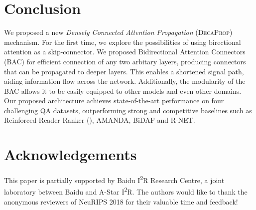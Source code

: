 \documentclass{article}
\begin{document}
\section{Conclusion}
We proposed a new \textit{Densely Connected Attention Propagation} (\textsc{DecaProp}) mechanism. For the first time, we explore the possibilities of using birectional attention as a skip-connector. We proposed Bidirectional Attention Connectors (BAC) for efficient connection of any two arbitary layers, producing connectors that can be propagated to deeper layers. This enables a shortened signal path, aiding information flow across the network. Additionally, the modularity of the BAC allows it to be easily equipped to other models and even other domains. Our proposed architecture achieves state-of-the-art performance on four challenging QA datasets, outperforming strong and competitive baselines such as Reinforced Reader Ranker (), AMANDA, BiDAF and R-NET.

\section{Acknowledgements}
This paper is partially supported by Baidu I\textsuperscript2R Research Centre, a joint laboratory between Baidu and A-Star I\textsuperscript2R. The authors would like to thank the anonymous reviewers of NeuRIPS 2018 for their valuable time and feedback!



\end{document}
